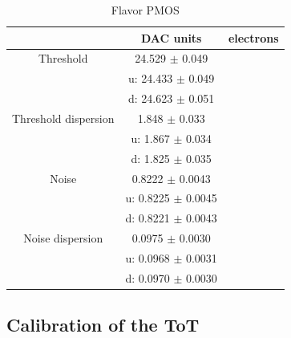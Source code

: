     
    
        \begin{table}
                \begin{center}
                \begin{tabular}{| c | c | c |}
                \hline
                 & DAC units & electrons \\
                \hline
                \hline
                Threshold        & 24.529 $\pm$ 0.049 & \\
                                 &u: 24.433 $\pm$ 0.049 & \\ 
                                 &d: 24.623 $\pm$ 0.051 &    \\      
                Threshold dispersion & 1.848 $\pm$ 0.033 &\\
                                 &u: 1.867 $\pm$ 0.034 & \\ 
                                 &d: 1.825 $\pm$ 0.035 &    \\ 
                Noise            & 0.8222 $\pm$ 0.0043 & \\
                                 &u: 0.8225 $\pm$ 0.0045 & \\ 
                                 &d: 0.8221 $\pm$ 0.0043 &    \\      
                Noise dispersion & 0.0975 $\pm$ 0.0030 &\\
                                 &u: 0.0968 $\pm$ 0.0031 & \\ 
                                 &d: 0.0970 $\pm$ 0.0030 &    \\ 
                \hline
                \end{tabular}
                \caption{Flavor PMOS}
                \label{tab:}
                \end{center}
        \end{table}        
            
             
                   
        

    \subsection{Calibration of the ToT}    

